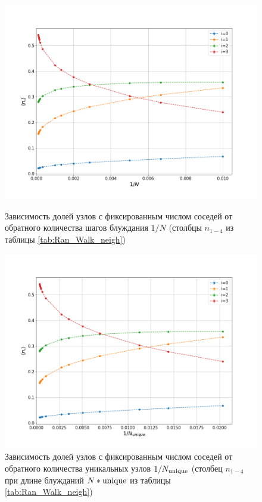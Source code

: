 \begin{figure}[h]
    
\begin{minipage}{0.49\textwidth}
\centering
\includegraphics[width=\textwidth]{Sections/Images_2/Rand_Path_n_i.png}
\caption{Зависимость долей узлов с фиксированным числом соседей от обратного количества шагов блуждания $1/N$  (столбцы $n_{1-4}$ из таблицы \ref{tab:Ran_Walk_neigh})}
\label{fig:DS_n_i}
\end{minipage}
\hfill
\begin{minipage}{0.49\textwidth}
\centering
\includegraphics[width=\textwidth]{Sections/Images_2/Rand_Path_n_i_unique.png}
\caption{Зависимость долей узлов с фиксированным числом соседей от обратного количества уникальных узлов $1/N_{\textup{unique}}$  (столбец $n_{1-4}$ при длине блужданий $N * \textup{unique}$ из таблицы \ref{tab:Ran_Walk_neigh})}

\end{minipage}
\end{figure}
